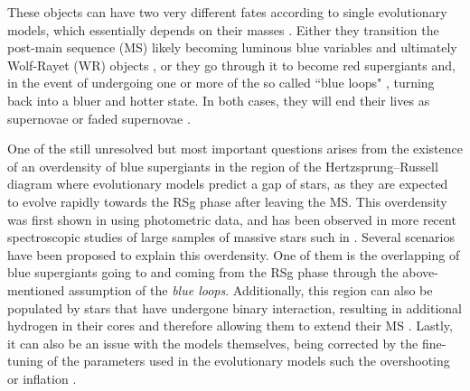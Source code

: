 \documentclass{aa}
\begin{document}
These objects can have two very different fates according to single evolutionary models, which essentially depends on their masses \citep[e.g.][]{2011A&A...530A.115B,2012A&A...537A.146E}. Either they transition the post-main sequence (MS) likely becoming luminous blue variables \citep[LBVs,][]{1994PASP..106.1025H,2011MNRAS.415..773S,2020Galax...8...20W} and ultimately Wolf-Rayet (WR) objects \citep{1987ARA&A..25..113A,1991IAUS..143..485H,2000A&A...360..227N}, or they go through it to become red supergiants \citep[RSgs,][]{2005ApJ...628..973L} and, in the event of undergoing one or more of the so called ``blue loops" \citep{1975ApJ...198..407S,2012A&A...537A.146E}, turning back into a bluer and hotter state. In both cases, they will end their lives as supernovae \citep{2002RvMP...74.1015W,2009ARA&A..47...63S} or faded supernovae \citep{2017MNRAS.468.4968A}.

One of the still unresolved but most important questions arises from the existence of an overdensity of blue supergiants in the region of the Hertzsprung–Russell diagram where evolutionary models predict a gap of stars, as they are expected to evolve rapidly towards the RSg phase after leaving the MS. This overdensity was first shown in \citet{1990ApJ...363..119F} using photometric data, and has been observed in more recent spectroscopic studies of large samples of massive stars such in \citet{2014A&A...570L..13C}. Several scenarios have been proposed to explain this overdensity. One of them is the overlapping of blue supergiants going to and coming from the RSg phase through the above-mentioned assumption of the \textit{blue loops}. Additionally, this region can also be populated by stars that have undergone binary interaction, resulting in additional hydrogen in their cores and therefore allowing them to extend their MS \citep{2012Sci...337..444S,2013ApJ...764..166D}. Lastly, it can also be an issue with the models themselves, being corrected by the fine-tuning of the parameters used in the evolutionary models such the overshooting or inflation \citep{2014A&A...570L..13C,2021A&A...648A.126M}.
\end{document}
